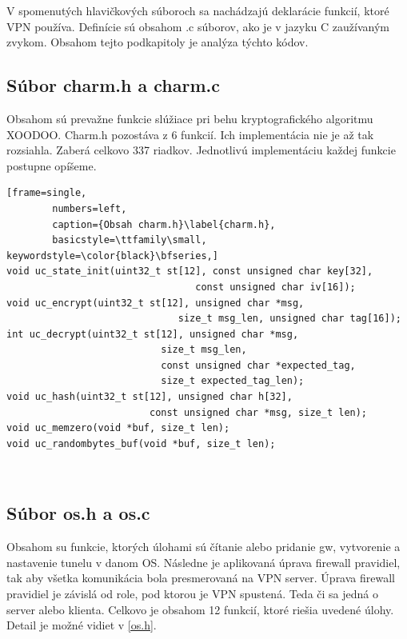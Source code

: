  V spomenutých hlavičkových súboroch sa nachádzajú deklarácie funkcií, ktoré VPN používa. Definície sú obsahom .c súborov, ako je v jazyku C zaužívaným zvykom. Obsahom tejto podkapitoly je analýza týchto kódov. 
 
 \subsection{Súbor charm.h a charm.c}
 Obsahom sú prevažne funkcie slúžiace pri behu kryptografického algoritmu XOODOO. Charm.h pozostáva z 6 funkcií. Ich implementácia nie je až tak rozsiahla. Zaberá celkovo 337 riadkov. Jednotlivú implementáciu každej funkcie postupne opíšeme. 
 
   \begin{minipage}{\linewidth} 	
  	\begin{lstlisting}[frame=single,
  		numbers=left,
  		caption={Obsah charm.h}\label{charm.h},
  		basicstyle=\ttfamily\small, keywordstyle=\color{black}\bfseries,]
void uc_state_init(uint32_t st[12], const unsigned char key[32], 
				  			 	 const unsigned char iv[16]);
void uc_encrypt(uint32_t st[12], unsigned char *msg, 
							  size_t msg_len, unsigned char tag[16]);	
int uc_decrypt(uint32_t st[12], unsigned char *msg, 
			   			   size_t msg_len,
			   			   const unsigned char *expected_tag, 
			   			   size_t expected_tag_len);
void uc_hash(uint32_t st[12], unsigned char h[32],
			 			 const unsigned char *msg, size_t len);
void uc_memzero(void *buf, size_t len);
void uc_randombytes_buf(void *buf, size_t len);
  		 	\end{lstlisting}
  	\end{minipage}\\
 \subsection{Súbor os.h a os.c}
 Obsahom su funkcie, ktorých úlohami sú čítanie alebo pridanie \acrshort{gw}, vytvorenie a nastavenie tunelu v danom OS. Následne je aplikovaná úprava firewall pravidiel, tak aby všetka komunikácia bola presmerovaná na VPN server. Úprava firewall pravidiel je závislá od role, pod ktorou je VPN spustená. Teda či sa jedná o server alebo klienta. 
 Celkovo je obsahom 12 funkcií, ktoré riešia uvedené úlohy. Detail je možné vidiet v \ref{os.h}.
 
